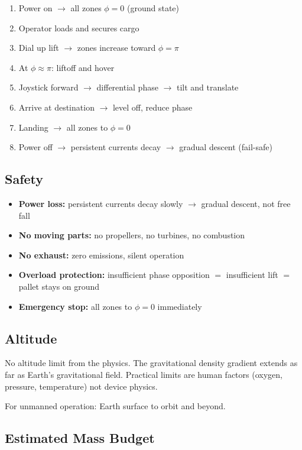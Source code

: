 \documentclass[11pt, a4paper]{article}
\begin{document}
\begin{enumerate}[nosep]
  \item Power on $\to$ all zones $\phi = 0$ (ground state)
  \item Operator loads and secures cargo
  \item Dial up lift $\to$ zones increase toward $\phi = \pi$
  \item At $\phi \approx \pi$: liftoff and hover
  \item Joystick forward $\to$ differential phase $\to$ tilt
        and translate
  \item Arrive at destination $\to$ level off, reduce phase
  \item Landing $\to$ all zones to $\phi = 0$
  \item Power off $\to$ persistent currents decay $\to$ gradual
        descent (fail-safe)
\end{enumerate}

\subsection{Safety}

\begin{itemize}[nosep]
  \item \textbf{Power loss:} persistent currents decay slowly
        $\to$ gradual descent, not free fall
  \item \textbf{No moving parts:} no propellers, no turbines,
        no combustion
  \item \textbf{No exhaust:} zero emissions, silent operation
  \item \textbf{Overload protection:} insufficient phase
        opposition $=$ insufficient lift $=$ pallet stays on
        ground
  \item \textbf{Emergency stop:} all zones to $\phi = 0$
        immediately
\end{itemize}

\subsection{Altitude}

No altitude limit from the physics. The gravitational density
gradient extends as far as Earth's gravitational field. Practical
limits are human factors (oxygen, pressure, temperature) not
device physics.

For unmanned operation: Earth surface to orbit and beyond.

\subsection{Estimated Mass Budget}
\end{document}
